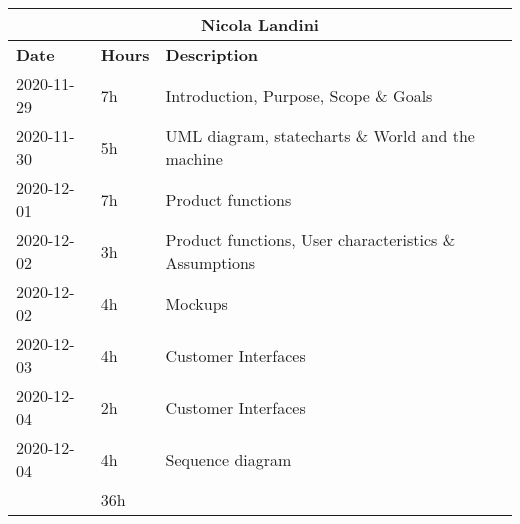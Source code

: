 \begin{table}[H]
    \centering
    \begin{tabular}{|l|l|l|}
        \multicolumn{3}{c}{\textbf{Nicola Landini}}                      \\
        \hline
        \textbf{Date} & \textbf{Hours} & \textbf{Description}                                   \\\hline
        2020-11-29    & 7h             & Introduction, Purpose, Scope \& Goals                  \\\hline
        2020-11-30    & 5h             & UML diagram, statecharts \& World and the machine      \\\hline
        2020-12-01    & 7h             & Product functions                                      \\\hline
        2020-12-02    & 3h             & Product functions, User characteristics \& Assumptions \\\hline
        2020-12-02    & 4h             & Mockups                                                \\\hline
        2020-12-03    & 4h             & Customer Interfaces                                    \\\hline
        2020-12-04    & 2h             & Customer Interfaces                                    \\\hline
        2020-12-04    & 4h             & Sequence diagram                                       \\\hline\hline
                      & 36h            &                                                        \\\hline
    \end{tabular}
\end{table}

